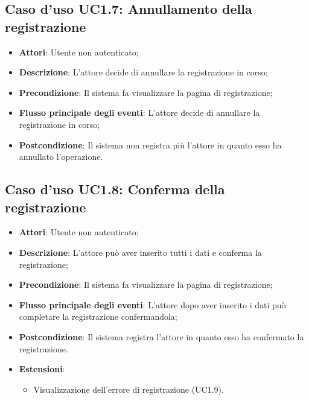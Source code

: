 \subsection{Caso d'uso \texorpdfstring{UC1.7}{UC1.7}: Annullamento della registrazione}
\begin{itemize}
	\item \textbf{Attori}: Utente non autenticato;
	\item \textbf{Descrizione}: L'attore decide di annullare la registrazione in corso;
	\item \textbf{Precondizione}: Il sistema fa visualizzare la pagina di registrazione;
	\item \textbf{Flusso principale degli eventi}: L'attore decide di annullare la registrazione in corso;
	\item \textbf{Postcondizione}: Il sistema non registra più l'attore in quanto esso ha annullato l'operazione.
\end{itemize}
\subsection{Caso d'uso \texorpdfstring{UC1.8}{UC1.8}: Conferma della registrazione}
\begin{itemize}
	\item \textbf{Attori}: Utente non autenticato;
	\item \textbf{Descrizione}: L'attore può aver inserito tutti i dati  e conferma la registrazione;
	\item \textbf{Precondizione}: Il sistema fa visualizzare la pagina di registrazione;
	\item \textbf{Flusso principale degli eventi}: L'attore dopo aver inserito i dati può completare la registrazione confermandola;
	\item \textbf{Postcondizione}: Il sistema registra l'attore in quanto esso ha confermato la registrazione.
	\item \textbf{Estensioni}:
	\begin{itemize}
		\item Visualizzazione dell'errore di registrazione (UC1.9).
	\end{itemize}
\end{itemize}
